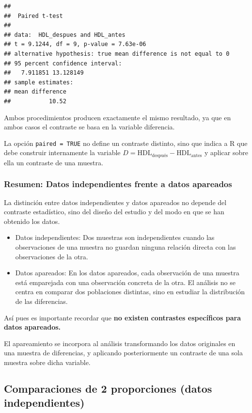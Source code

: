 \documentclass[
]{article}
\begin{document}
\begin{verbatim}
## 
##  Paired t-test
## 
## data:  HDL_despues and HDL_antes
## t = 9.1244, df = 9, p-value = 7.63e-06
## alternative hypothesis: true mean difference is not equal to 0
## 95 percent confidence interval:
##   7.911851 13.128149
## sample estimates:
## mean difference 
##           10.52
\end{verbatim}

Ambos procedimientos producen exactamente el mismo resultado, ya que en ambos casos el contraste
se basa en la variable diferencia.

La opción \texttt{paired\ =\ TRUE} no define un contraste distinto, sino que indica a R que debe construir
internamente la variable \(D = \text{HDL}_{\text{después}} - \text{HDL}_{\text{antes}}\)
y aplicar sobre ella un contraste de una muestra.

\subsubsection{Resumen: Datos independientes frente a datos apareados}\label{resumen-datos-independientes-frente-a-datos-apareados}

La distinción entre datos independientes y datos apareados no depende del contraste estadístico,
sino del diseño del estudio y del modo en que se han obtenido los datos.

\begin{itemize}
\item
  Datos independientes: Dos muestras son independientes cuando las observaciones de una muestra no guardan ninguna relación directa con las observaciones de la otra.
\item
  Datos apareados: En los datos apareados, cada observación de una muestra está emparejada con una observación concreta de la otra. El análisis no se centra en comparar dos poblaciones distintas, sino en estudiar la distribución de las diferencias.
\end{itemize}

Así pues es importante recordar que \textbf{no existen contrastes específicos para datos apareados.}

El apareamiento se incorpora al análisis transformando los datos originales en una muestra de diferencias, y aplicando posteriormente un contraste de una sola muestra sobre dicha variable.

\subsection{Comparaciones de 2 proporciones (datos independientes)}\label{comparaciones-de-2-proporciones-datos-independientes}
\end{document}

